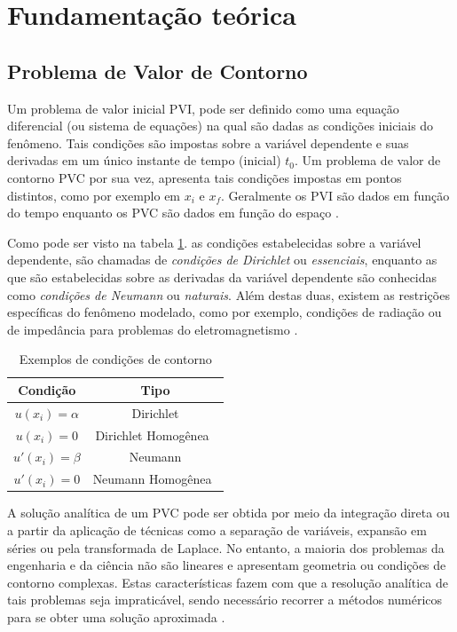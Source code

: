 \documentclass[
    12pt,               %
    openright,          %
    oneside,
    a4paper,            %
    english,            %
    french,             %
    spanish,            %
    brazil              %
    ]{abntex2}
\begin{document}
\section{Fundamentação teórica}



\subsection{Problema de Valor de Contorno}
\label{sec:PVC}


Um problema de valor inicial PVI, pode ser definido como uma equação diferencial (ou sistema de equações)  na qual são dadas as condições iniciais do fenômeno. Tais condições são impostas sobre a variável dependente e suas derivadas em um único instante de tempo (inicial) $t_0$. Um problema de valor de contorno PVC por sua vez, apresenta tais condições impostas em pontos distintos, como por exemplo em $x_i$ e $x_f$. Geralmente os PVI são dados em função do tempo enquanto os PVC são dados em função do espaço \cite{boyceDiprima}.

Como pode ser visto na tabela \ref{tab:cond}. as condições estabelecidas sobre a variável dependente, são chamadas de \textit{condições de Dirichlet} ou \textit{essenciais}, enquanto as que são estabelecidas sobre as derivadas da variável dependente são  conhecidas como \textit{condições de Neumann} ou  \textit{naturais}. Além destas duas, existem as restrições específicas do fenômeno modelado, como por exemplo, condições de radiação ou de impedância para problemas do eletromagnetismo \cite{jin}. 


\begin{table}   
	\centering
	\begin{tabular}{|c|c|}  
		\hline
		\textbf{Condição} 
		& \textbf{Tipo} \\  
		\hline
		$u(x_i) = \alpha $ 
		& Dirichlet \\
		\hline
		$u(x_i) = 0$
		& Dirichlet Homogênea\  \\
		\hline
		$u'(x_i) = \beta$
		& Neumann \\
		\hline
		$u'(x_i) = 0$
		& Neumann Homogênea\  \\
		\hline
	\end{tabular}
	\caption{Exemplos de condições de contorno}
	\label{tab:cond}
\end{table}


A solução analítica de um PVC pode ser obtida por meio da integração direta ou a partir da aplicação de técnicas como a separação de variáveis, expansão em séries ou pela transformada de Laplace.
No entanto, a maioria dos problemas da engenharia e da ciência não são lineares e apresentam geometria ou condições de contorno complexas.  Estas características fazem com que a resolução analítica de tais problemas seja impraticável, sendo necessário recorrer a métodos numéricos para se obter uma solução aproximada \cite{boyceDiprima, powers}.
\end{document}

